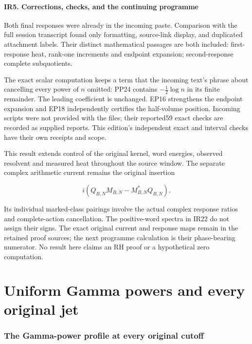 \documentclass[10pt]{article}
\begin{document}
\subsection{IR5. Corrections, checks, and the continuing programme}\label{ir5.-corrections-checks-and-the-continuing-programme}

Both final responses were already in the incoming paste. Comparison with the full session transcript found only formatting, source-link display, and duplicated attachment labels. Their distinct mathematical passages are both included: first-response heat, rank-one increments and endpoint expansion; second-response complete subquotients.

The exact scalar computation keeps a term that the incoming text's phrase about cancelling every power of \(n\) omitted: PP24 contains \(-\tfrac12\log n\) in its finite remainder. The leading coefficient is unchanged. EP16 strengthens the endpoint expansion and EP18 independently certifies the half-volume position. Incoming scripts were not provided with the files; their reported59 exact checks are recorded as supplied reports. This edition's independent exact and interval checks have their own receipts and scope.

This result extends control of the original kernel, word energies, observed resolvent and measured heat throughout the source window. The separate complex arithmetic current remains the original insertion

\[
 i(Q_{B,N}M_{B,N}-M_{B,N}^*Q_{B,N}).
 \tag{IR24}
\]

Its individual marked-class pairings involve the actual complex response ratios and complete-action cancellation. The positive-word spectra in IR22 do not assign their signs. The exact original current and response maps remain in the retained proof sources; the next programme calculation is their phase-bearing numerator. No result here claims an RH proof or a hypothetical zero computation.

\clearpage\part{Uniform Gamma powers and every original jet}
\section{The Gamma-power profile at every original cutoff}\label{the-gamma-power-profile-at-every-original-cutoff}
\end{document}
